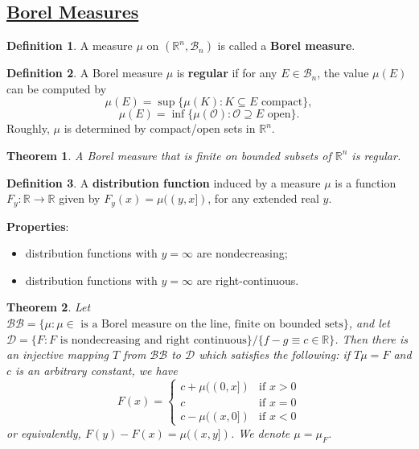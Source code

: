 \documentclass[11pt]{amsart}
\newtheorem*{theorem*}{Theorem}
\theoremstyle{definition}
\newtheorem*{definition*}{Definition}
\renewcommand\:{\colon}
\newcommand{\calB}{\mathcal{B}}
\newcommand{\calD}{\mathcal{D}}
\newcommand{\calO}{\mathcal{O}}
\newcommand{\R}{\mathds{R}}
\begin{document}
\subsection*{\underline{Borel Measures}}
\vskip20pt

\begin{definition*}
	A measure $\mu$ on $(\R^n, \calB_n)$ is called a \textbf{Borel measure}.
\end{definition*}

\begin{definition*}
	A Borel measure $\mu$ is \textbf{regular} if for any $E \in \calB_n$, the value $\mu(E)$ can be computed by
		\[ \mu(E) = \sup \{\mu(K) : K \subseteq E \text{ compact}\}, \]
		\[ \mu(E) = \inf \{\mu(\calO) : \calO \supseteq E \text{ open}\}. \]
	Roughly, $\mu$ is determined by compact/open sets in $\R^n$.
\end{definition*}

\begin{theorem*}
	A Borel measure that is finite on bounded subsets of $\R^n$ is regular.
\end{theorem*}

\begin{definition*}
	A \textbf{distribution function} induced by a measure $\mu$ is a function $F_y\: \R \to \R$ given by $F_y(x) = \mu((y, x])$, for any extended real $y$.
\end{definition*}

\noindent \textbf{Properties}:
\begin{itemize}[leftmargin=*]\setlength\itemsep{0em}
	\item distribution functions with $y = \infty$ are nondecreasing;
	\item distribution functions with $y = \infty$ are right-continuous.
\end{itemize}

\begin{theorem*}
	Let $\calB\calB = \{ \mu : \mu \in \text{ is a Borel measure on the line, finite on bounded sets} \}$, and let $\calD = \{F : F \text{ is nondecreasing and right continuous} \}/\{f-g \equiv c \in \R\}$. Then there is an injective mapping $T$ from $\calB\calB$ to $\calD$ which satisfies the following: if $T\mu = F$ and $c$ is an arbitrary constant, we have
		\[ F(x) = \left\{ \begin{array}{ll} c + \mu((0, x]) & \text{if } x > 0 \\ c & \text{if } x = 0 \\ c - \mu((x, 0]) & \text{if } x < 0 \end{array} \right. \]
	or equivalently, $F(y) - F(x) = \mu((x, y])$. We denote $\mu = \mu_F$.
\end{theorem*}
\end{document}
